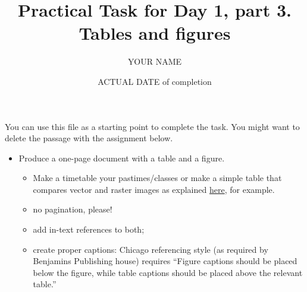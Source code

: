 \documentclass[a4paper,11pt]{article}
\title{Practical Task for Day 1, part 3. Tables and figures}
\author{YOUR NAME}
\date{ACTUAL DATE of completion}
\begin{document}
	
	\maketitle


\bigskip

You can use this file as a starting point to complete the task. You might want to delete the passage with the assignment below.

\bigskip

\begin{itemize}
	\item Produce a one-page document with a table and a figure.
	\begin{itemize}
		\item Make a timetable your pastimes/classes or make a simple table that compares vector and raster images as explained  \href{https://tinyurl.com/yf8orxog}{here}, for example.
		\item no pagination, please!
		\item add in-text references to both;
		\item create proper captions: Chicago referencing style (as required by Benjamins Publishing house) requires ``Figure captions should be placed below the figure, while table captions should be placed above the relevant table.'' 
	\end{itemize} 
\end{itemize}
	
\end{document}
